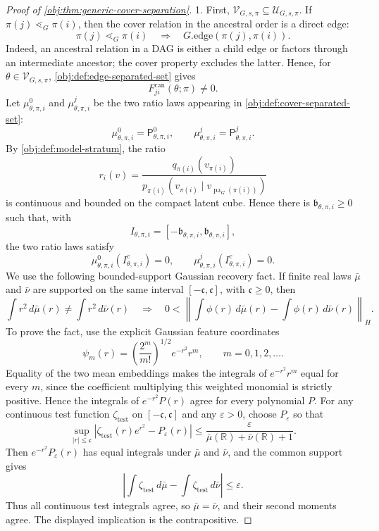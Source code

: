 \begin{proof}[Proof of \cref{obj:thm:generic-cover-separation}]
1.  First, \(\mathcal V_{G,s,\pi}\subseteq \mathcal U_{G,s,\pi}\).  If
\(\pi(j)\lessdot_G\pi(i)\), then the cover relation in the ancestral order is a
direct edge:
\[
\pi(j)\lessdot_G\pi(i)\quad\Longrightarrow\quad G.\mathrm{edge}(\pi(j),\pi(i)).
\]
Indeed, an ancestral relation in a DAG is either a child edge or factors through
an intermediate ancestor; the cover property excludes the latter.  Hence, for
\(\theta\in\mathcal V_{G,s,\pi}\), \cref{obj:def:edge-separated-set} gives
\[
F^{\mathrm{can}}_{ji}(\theta;\pi)\ne 0.
\]
Let \(\mu^0_{\theta,\pi,i}\) and \(\mu^j_{\theta,\pi,i}\) be the two ratio laws
appearing in \cref{obj:def:cover-separated-set}:
\[
\mu^0_{\theta,\pi,i}=\mathsf P^0_{\theta,\pi,i},
\qquad
\mu^j_{\theta,\pi,i}=\mathsf P^j_{\theta,\pi,i}.
\]
By \cref{obj:def:model-stratum}, the ratio
\[
r_i(v)=
\frac{q_{\pi(i)}(v_{\pi(i)})}
     {p_{\pi(i)}(v_{\pi(i)}\mid v_{\operatorname{pa}_G(\pi(i))})}
\]
is continuous and bounded on the compact latent cube.  Hence there is
\(\mathfrak b_{\theta,\pi,i}\ge0\) such that, with
\[
I_{\theta,\pi,i}=[-\mathfrak b_{\theta,\pi,i},\mathfrak b_{\theta,\pi,i}],
\]
the two ratio laws satisfy
\[
\mu^0_{\theta,\pi,i}(I_{\theta,\pi,i}^{c})=0,
\qquad
\mu^j_{\theta,\pi,i}(I_{\theta,\pi,i}^{c})=0.
\]
We use the following bounded-support Gaussian recovery fact.  If finite real
laws \(\bar\mu\) and \(\bar\nu\) are supported on the same interval
\([-\mathfrak c,\mathfrak c]\), with \(\mathfrak c\ge0\), then
\[
\int r^2\,d\bar\mu(r)\ne \int r^2\,d\bar\nu(r)
\quad\Longrightarrow\quad
0<
\left\|
\int \phi(r)\,d\bar\mu(r)-\int \phi(r)\,d\bar\nu(r)
\right\|_H .
\]
To prove the fact, use the explicit Gaussian feature coordinates
\[
\psi_m(r)=\left(\frac{2^m}{m!}\right)^{1/2}e^{-r^2}r^m,
\qquad m=0,1,2,\ldots .
\]
Equality of the two mean embeddings makes the integrals of
\(e^{-r^2}r^m\) equal for every \(m\), since the coefficient multiplying this
weighted monomial is strictly positive.  Hence the integrals of
\(e^{-r^2}P(r)\) agree for every polynomial \(P\).  For any continuous test function
\(\zeta_{\mathrm{test}}\) on \([-\mathfrak c,\mathfrak c]\) and any
\(\varepsilon>0\), choose \(P_\varepsilon\) so that
\[
\sup_{|r|\le\mathfrak c}
\left|\zeta_{\mathrm{test}}(r)e^{r^2}-P_\varepsilon(r)\right|
\le
\frac{\varepsilon}{\bar\mu(\mathbb R)+\bar\nu(\mathbb R)+1}.
\]
Then \(e^{-r^2}P_\varepsilon(r)\) has equal integrals under \(\bar\mu\) and
\(\bar\nu\), and the common support gives
\[
\left|\int \zeta_{\mathrm{test}}\,d\bar\mu-
\int \zeta_{\mathrm{test}}\,d\bar\nu\right|
\le\varepsilon.
\]
Thus all continuous test integrals agree, so \(\bar\mu=\bar\nu\), and their
second moments agree.  The displayed implication is the contrapositive.


\end{proof}
